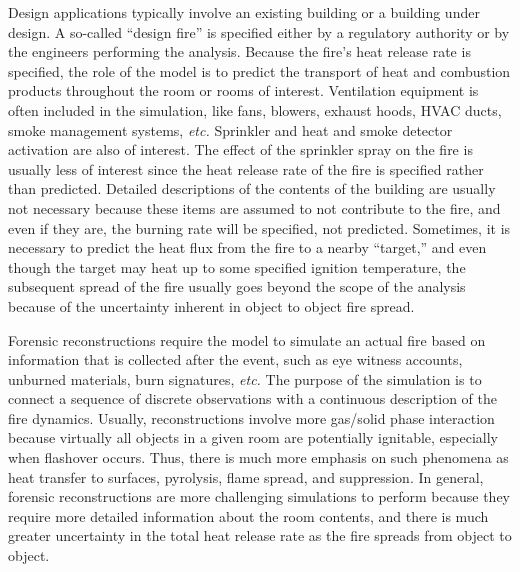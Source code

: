 Design  applications  typically  involve  an existing  building  or  a
building  under  design. A  so-called  ``design  fire'' is  specified
either by  a regulatory authority  or by the engineers  performing the
analysis. Because the  fire's heat release rate is  specified, the role of
the model is to predict  the transport of heat and combustion products
throughout  the room or  rooms of  interest. Ventilation  equipment is
often included  in the simulation, like fans,  blowers, exhaust hoods,
HVAC ducts,  smoke management systems,  {\em etc.} Sprinkler  and heat
and smoke detector activation are also of interest.  The effect of the
sprinkler spray on the fire is usually less of interest since the heat release rate of the fire
is  specified rather  than  predicted. Detailed  descriptions of  the
contents of the building are usually not necessary because these items
are assumed to not contribute to the fire,  and even if they are, the burning rate
will be specified, not predicted.  Sometimes, it is necessary  to predict
the heat  flux from the fire  to a nearby ``target,''  and even though
the target  may heat up  to some specified ignition  temperature, the
subsequent spread  of the  fire usually goes  beyond the scope  of the
analysis because of the uncertainty  inherent in object to object fire
spread.

Forensic reconstructions require the  model to simulate an actual fire
based on  information that is collected  after the event,  such as eye
witness accounts, unburned materials,  burn signatures, {\em etc.} The
purpose  of  the simulation  is  to  connect  a sequence  of  discrete
observations  with  a continuous  description  of  the fire  dynamics.
Usually,  reconstructions  involve  more gas/solid  phase  interaction
because  virtually  all  objects  in  a  given  room  are  potentially
ignitable, especially when flashover  occurs. Thus, there is much more
emphasis on  such phenomena as  heat transfer to  surfaces, pyrolysis,
flame  spread, and suppression.  In general,  forensic reconstructions
are more challenging simulations  to perform because they require more
detailed  information  about the  room  contents,  and  there is  much
greater uncertainty in the total heat release rate as the fire spreads
from object to object.

